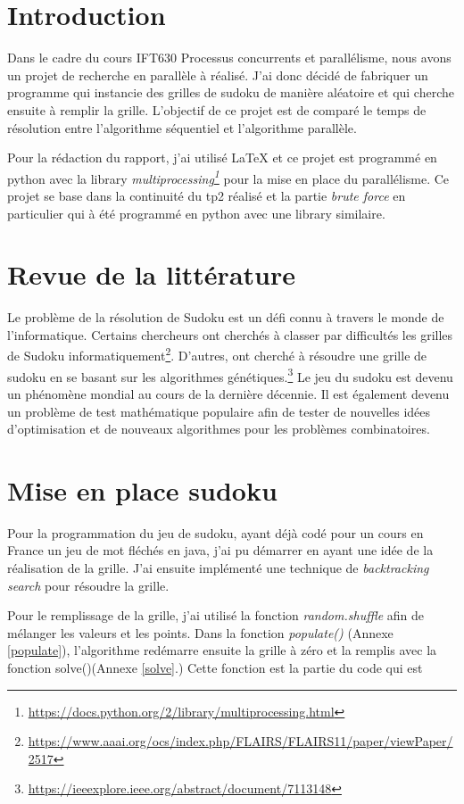 \documentclass[12pt]{article}
\begin{document}
\newpage
\tableofcontents

\newpage
\section{Introduction}
Dans le cadre du cours IFT630 Processus concurrents et parallélisme, nous avons un projet de recherche en parallèle à réalisé. J'ai donc décidé de fabriquer un programme qui instancie des grilles de sudoku de manière aléatoire et qui cherche ensuite à remplir la grille. L'objectif de ce projet est de comparé le temps de résolution entre l'algorithme séquentiel et l'algorithme parallèle.

Pour la rédaction du rapport, j'ai utilisé LaTeX et ce projet est programmé en python avec la library \textit{multiprocessing\footnote{\url{https://docs.python.org/2/library/multiprocessing.html}}} pour la mise en place du parallélisme. Ce projet se base dans la continuité du tp2 réalisé et la partie \textit{brute force} en particulier qui à été programmé en python avec une library similaire.

\section{Revue de la littérature}
Le problème de la résolution de Sudoku est un défi connu à travers le monde de l'informatique. Certains chercheurs ont cherchés à classer par difficultés les grilles de Sudoku informatiquement\footnote{\url{https://www.aaai.org/ocs/index.php/FLAIRS/FLAIRS11/paper/viewPaper/2517}}. D'autres, ont cherché à résoudre une grille de sudoku en se basant sur les algorithmes génétiques.\footnote{\url{https://ieeexplore.ieee.org/abstract/document/7113148}} Le jeu du sudoku est devenu un phénomène mondial au cours de la dernière décennie.  Il est également devenu un problème de test mathématique populaire afin de tester de nouvelles idées d'optimisation et de nouveaux algorithmes pour les problèmes combinatoires.

\section{Mise en place sudoku}
Pour la programmation du jeu de sudoku, ayant déjà codé pour un cours en France un jeu de mot fléchés en java, j'ai pu démarrer en ayant une idée de la réalisation de la grille. J'ai ensuite implémenté une technique de \textit{backtracking search} pour résoudre la grille. 

Pour le remplissage de la grille, j'ai utilisé la fonction \textit{random.shuffle} afin de mélanger les valeurs et les points. Dans la fonction \textit{populate()} (Annexe \ref{populate}), l'algorithme redémarre ensuite la grille à zéro et la remplis avec la fonction solve()(Annexe \ref{solve}.) Cette fonction est la partie du code qui est  
\end{document}
